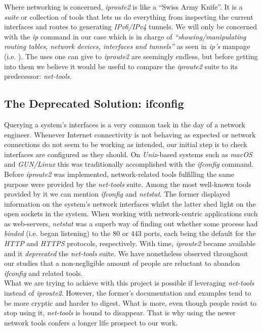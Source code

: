         Where networking is concerned, \textit{iproute2} \cite{bib:man-ip} is like a ``Swiss Army Knife''. It is a \textit{suite} or collection of tools that lets us do everything from inspecting the current interfaces and routes to generating \textit{IPv6/IPv4} tunnels. We will only be concerned with the \textit{ip} command in our case which is in charge of \textit{``showing/manipulating routing tables, network devices, interfaces and tunnels''} as seen in \textit{ip's} manpage (i.e. \cite{bib:man-ip}). The uses one can give to \textit{iproute2} are seemingly endless, but before getting into them we believe it would be useful to compare the \textit{iproute2} suite to its predecessor: \textit{net-tools}.\\

        \subsection{The Deprecated Solution: ifconfig}
            Querying a system's interfaces is a very common task in the day of a network engineer. Whenever Internet connectivity is not behaving as expected or network connections do not seem to be working as intended, our initial step is to check interfaces are configured as they should. On \textit{Unix}-based systems such as \textit{macOS} and \textit{GUN/Linux} this was traditionally accomplished with the \textit{ifconfig} command. Before \textit{iproute2} was implemented, network-related tools fulfilling the same purpose were provided by the \textit{net-tools} suite. Among the most well-known tools provided by it we can mention \textit{ifconfig} and \textit{netstat}. The former displayed information on the system's network interfaces whilst the latter shed light on the open sockets in the system. When working with network-centric applications such as web-servers, \textit{netstat} was a superb way of finding out whether some process had \textit{binded} (i.e. began listening) to the $80$ or $443$ ports, each being the default for the \textit{HTTP} and \textit{HTTPS} protocols, respectively. With time, \textit{iproute2} became available and it \textit{deprecated} \cite{bib:net-tools-deprecation} the \textit{net-tools} suite. We have nonetheless observed throughout our studies that a non-negligible amount of people are reluctant to abandon \textit{ifconfig} and related tools.\\

            What we are trying to achieve with this project is possible if leveraging \textit{net-tools} instead of \textit{iproute2}. However, the former's documentation and examples tend to be more cryptic and harder to digest. What is more, even though people resist to stop using it, \textit{net-tools} is bound to disappear. That is why using the newer network tools confers a longer life prospect to our work.\\

